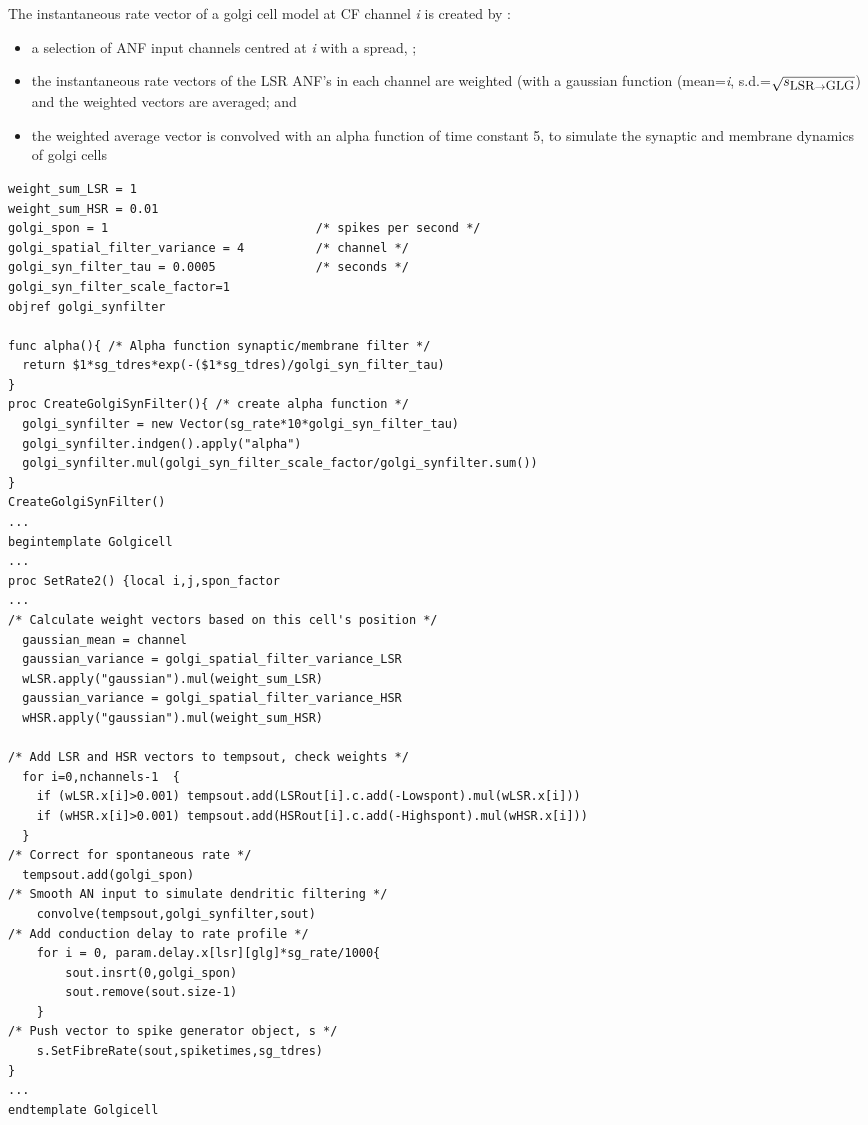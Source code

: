 The instantaneous rate vector of a golgi cell model at CF channel \emph{i} is
created by :
\begin{itemize}
\item a selection of ANF input channels centred at \emph{i} with a spread,
  \sLSRGLG;
\item the instantaneous rate vectors of the LSR ANF's in each channel are
  weighted (with a gaussian function (mean=\emph{i}, s.d.=$\sqrt{\protect s_{\protect\mbox{\small{LSR}} \to \mbox{\small{GLG}}}}$) and
  the weighted vectors are averaged; and
\item the weighted average vector is convolved with an alpha function of time
  constant 5, to simulate the synaptic and membrane dynamics of golgi cells
\end{itemize}

 \medskip{}

 \begin{lstlisting}[label=GolgiTemplate,caption=Create golgi cell rate vector
   within Golgi template (in CNcell.tem)]
weight_sum_LSR = 1
weight_sum_HSR = 0.01
golgi_spon = 1                             /* spikes per second */
golgi_spatial_filter_variance = 4          /* channel */
golgi_syn_filter_tau = 0.0005              /* seconds */
golgi_syn_filter_scale_factor=1
objref golgi_synfilter

func alpha(){ /* Alpha function synaptic/membrane filter */
  return $1*sg_tdres*exp(-($1*sg_tdres)/golgi_syn_filter_tau)
}
proc CreateGolgiSynFilter(){ /* create alpha function */
  golgi_synfilter = new Vector(sg_rate*10*golgi_syn_filter_tau)
  golgi_synfilter.indgen().apply("alpha")  
  golgi_synfilter.mul(golgi_syn_filter_scale_factor/golgi_synfilter.sum()) 
}
CreateGolgiSynFilter()
...
begintemplate Golgicell
...
proc SetRate2() {local i,j,spon_factor
...
/* Calculate weight vectors based on this cell's position */
  gaussian_mean = channel
  gaussian_variance = golgi_spatial_filter_variance_LSR
  wLSR.apply("gaussian").mul(weight_sum_LSR)
  gaussian_variance = golgi_spatial_filter_variance_HSR
  wHSR.apply("gaussian").mul(weight_sum_HSR)

/* Add LSR and HSR vectors to tempsout, check weights */
  for i=0,nchannels-1  {
    if (wLSR.x[i]>0.001) tempsout.add(LSRout[i].c.add(-Lowspont).mul(wLSR.x[i]))
    if (wHSR.x[i]>0.001) tempsout.add(HSRout[i].c.add(-Highspont).mul(wHSR.x[i]))
  }
/* Correct for spontaneous rate */
  tempsout.add(golgi_spon)
/* Smooth AN input to simulate dendritic filtering */
    convolve(tempsout,golgi_synfilter,sout)
/* Add conduction delay to rate profile */
    for i = 0, param.delay.x[lsr][glg]*sg_rate/1000{
        sout.insrt(0,golgi_spon)
        sout.remove(sout.size-1)
    }
/* Push vector to spike generator object, s */
    s.SetFibreRate(sout,spiketimes,sg_tdres)
}
...
endtemplate Golgicell
\end{lstlisting}


